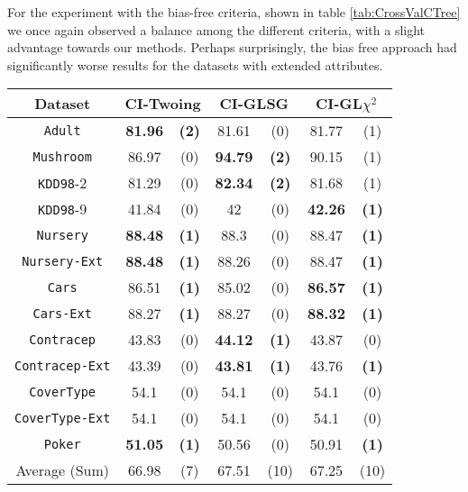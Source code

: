 For the experiment with the bias-free criteria, shown in table \ref{tab:CrossValCTree} we once again observed a balance among the different criteria, with a slight advantage towards our methods. Perhaps surprisingly, the bias free approach had significantly worse
results for the datasets with extended attributes.


\begin{table*}
\small
\centering
    \caption{Average accuracy and statistical tests  for  Conditional Inference trees 
with depth at most 5 using only nominal attributes. The best accuracy for each dataset is bold-faced.}
\label{tab:CrossValCTree}
\begin{tabular}{c|cc|cc|cc} 
Dataset &   \multicolumn{2}{c|}{CI-Twoing} &   \multicolumn{2}{c|}{CI-GLSG} & \multicolumn{2}{c}{CI-GL$\chi^2$} \\  \hline   
{\tt Adult}         &{\bf 81.96} &{\bf  (2)} & 81.61 & (0) & 81.77 & (1) \\
{\tt Mushroom}         &86.97 & (0) &{\bf  94.79 }& {\bf (2)} & 90.15 & (1) \\
{\tt KDD98}-2         &81.29 & (0) & {\bf 82.34 }& {\bf (2) }& 81.68 & (1) \\
{\tt KDD98}-9         &41.84 & (0) & 42    & (0) & {\bf 42.26} & {\bf (1)} \\
{\tt Nursery}         &{\bf 88.48} & {\bf (1)} & 88.3  & (0) & 88.47 & {\bf (1)} \\
{\tt Nursery-Ext}         &{\bf 88.48} & {\bf (1)} & 88.26 & (0) & 88.47 & {\bf (1)} \\
{\tt Cars}         &86.51 & {\bf (1)} & 85.02 & (0) & {\bf 86.57} & {\bf (1)} \\
{\tt Cars-Ext}         &88.27 & {\bf (1) }& 88.27& (0) & {\bf 88.32} & {\bf (1)} \\
{\tt Contracep}         &43.83 & (0) & {\bf 44.12} & {\bf (1)} & 43.87 & (0) \\
{\tt Contracep-Ext}         &43.39 & (0) & {\bf 43.81} & {\bf (1)} & 43.76 & {\bf (1)} \\
{\tt CoverType}         &54.1  & (0) & 54.1  & (0) & 54.1  & (0) \\
{\tt CoverType-Ext}         &54.1  & (0) & 54.1  & (0) & 54.1  & (0) \\
{\tt Poker}         &{\bf 51.05} & {\bf (1)} & 50.56 & (0) & 50.91 & {\bf (1)} \\  \hline
Average (Sum)         &66.98 & (7)  &  67.51 & (10)  & 67.25 &  (10)
       \end{tabular}
\end{table*}




